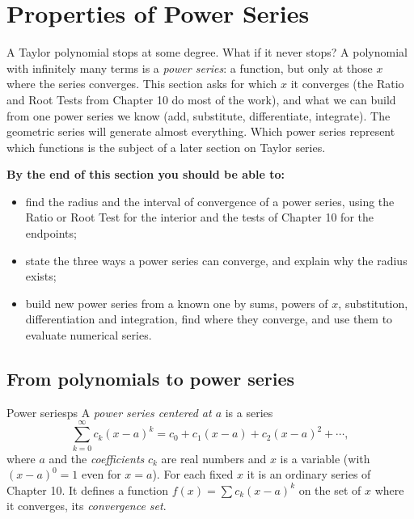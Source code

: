 \documentclass[11pt]{article}
\begin{document}
\section{Properties of Power Series}

\begin{guide}
A Taylor polynomial stops at some degree. What if it never stops? A polynomial with infinitely many terms is a \emph{power series}: a function, but only at those $x$ where the series converges. This section asks for which $x$ it converges (the Ratio and Root Tests from Chapter 10 do most of the work), and what we can build from one power series we know (add, substitute, differentiate, integrate). The geometric series will generate almost everything. Which power series represent which functions is the subject of a later section on Taylor series.
\end{guide}

\textbf{By the end of this section you should be able to:}
\begin{itemize}
  \item find the radius and the interval of convergence of a power series, using the Ratio or Root Test for the interior and the tests of Chapter 10 for the endpoints;
  \item state the three ways a power series can converge, and explain why the radius exists;
  \item build new power series from a known one by sums, powers of $x$, substitution, differentiation and integration, find where they converge, and use them to evaluate numerical series.
\end{itemize}

\subsection*{From polynomials to power series}

\begin{defn}{Power series}{ps}
A \emph{power series centered at $a$} is a series
\[
\sum_{k=0}^\infty c_k(x-a)^k=c_0+c_1(x-a)+c_2(x-a)^2+\cdots,
\]
where $a$ and the \emph{coefficients} $c_k$ are real numbers and $x$ is a variable (with $(x-a)^0=1$ even for $x=a$). For each fixed $x$ it is an ordinary series of Chapter 10. It defines a function $f(x)=\sum c_k(x-a)^k$ on the set of $x$ where it converges, its \emph{convergence set}.
\end{defn}
\end{document}
